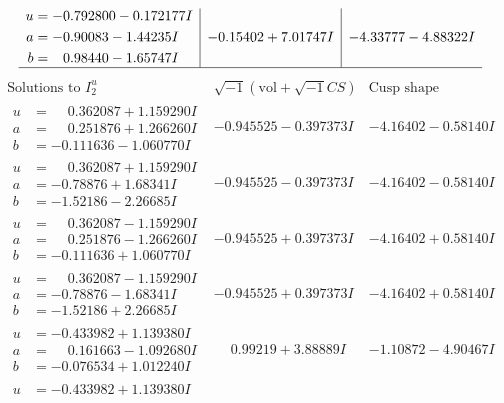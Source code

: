 \documentclass[1p]{elsarticle_modified}
\theoremstyle{definition}
\newcommand{\I}{\sqrt{-1}}
\begin{document}
$$\begin{array}{c|c|c}
\begin{aligned}
u &= -0.792800 - 0.172177 I \\
a &= -0.90083 - 1.44235 I \\
b &= \phantom{-}0.98440 - 1.65747 I\end{aligned}
 & -0.15402 + 7.01747 I & -4.33777 - 4.88322 I\\
 \hline 
 \end{array}$$\newpage$$\begin{array}{c|c|c}  
\text{Solutions to }I^u_{2}& \I (\text{vol} + \sqrt{-1}CS) & \text{Cusp shape}\\
 \hline 
\begin{aligned}
u &= \phantom{-}0.362087 + 1.159290 I \\
a &= \phantom{-}0.251876 + 1.266260 I \\
b &= -0.111636 - 1.060770 I\end{aligned}
 & -0.945525 - 0.397373 I & -4.16402 - 0.58140 I \\ \hline\begin{aligned}
u &= \phantom{-}0.362087 + 1.159290 I \\
a &= -0.78876 + 1.68341 I \\
b &= -1.52186 - 2.26685 I\end{aligned}
 & -0.945525 - 0.397373 I & -4.16402 - 0.58140 I \\ \hline\begin{aligned}
u &= \phantom{-}0.362087 - 1.159290 I \\
a &= \phantom{-}0.251876 - 1.266260 I \\
b &= -0.111636 + 1.060770 I\end{aligned}
 & -0.945525 + 0.397373 I & -4.16402 + 0.58140 I \\ \hline\begin{aligned}
u &= \phantom{-}0.362087 - 1.159290 I \\
a &= -0.78876 - 1.68341 I \\
b &= -1.52186 + 2.26685 I\end{aligned}
 & -0.945525 + 0.397373 I & -4.16402 + 0.58140 I \\ \hline\begin{aligned}
u &= -0.433982 + 1.139380 I \\
a &= \phantom{-}0.161663 - 1.092680 I \\
b &= -0.076534 + 1.012240 I\end{aligned}
 & \phantom{-}0.99219 + 3.88889 I & -1.10872 - 4.90467 I \\ \hline\begin{aligned}
u &= -0.433982 + 1.139380 I \\

\end{aligned}
\end{array}$$
\end{document}
